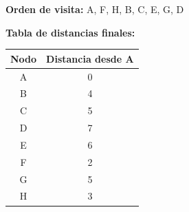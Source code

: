 \documentclass[12pt]{article}
\begin{document}
\begin{enumerate}
\begin{enumerate}[label=\alph*)]
                \textbf{Orden de visita:} A, F, H, B, C, E, G, D

                \textbf{Tabla de distancias finales:}

                \begin{center}
                    \begin{tabular}{|c|c|}
                        \hline
                        \textbf{Nodo} & \textbf{Distancia desde A} \\
                        \hline
                        A & 0 \\
                        \hline
                        B & 4 \\
                        \hline
                        C & 5 \\
                        \hline
                        D & 7 \\
                        \hline
                        E & 6 \\
                        \hline
                        F & 2 \\
                        \hline
                        G & 5 \\
                        \hline
                        H & 3 \\
                        \hline
                    \end{tabular}
                \end{center}      
            \end{enumerate}
        \end{enumerate}
\end{document}
